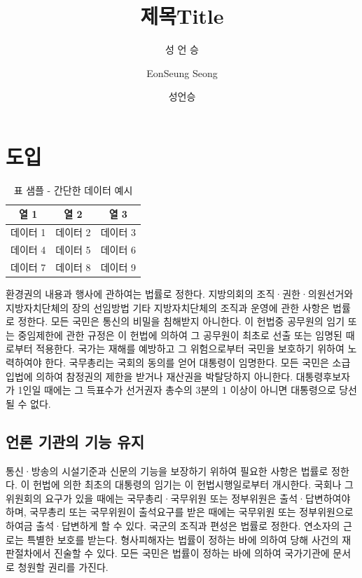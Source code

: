 \documentclass[master, korean]{pnuthesis}
\title[korean]{제목}
\title[english]{Title}
\author[korean]{성 언 승}
\author[english]{EonSeung Seong}
\author[nospace]{성언승}
\begin{document}
\renewcommand{\baselinestretch}{1.5}    %
\selectfont                             %

\changepage{5mm}{}{}{}{}{}{}{}{-5mm}    %
\makelists   %



\chapter{도입}


\begin{table}[!h]
    \centering
    \caption{표 샘플 - 간단한 데이터 예시}
    \label{tab:sample}
    \begin{tabular}{ccc}
        \toprule
        열 1 & 열 2 & 열 3 \\
        \midrule
        데이터 1 & 데이터 2 & 데이터 3 \\
        데이터 4 & 데이터 5 & 데이터 6 \\
        데이터 7 & 데이터 8 & 데이터 9 \\
        \bottomrule
    \end{tabular}
\end{table}



환경권의 내용과 행사에 관하여는 법률로 정한다. 지방의회의 조직·권한·의원선거와 지방자치단체의 장의 선임방법 기타 지방자치단체의 조직과 운영에 관한 사항은 법률로 정한다.\autocite{pennebaker1992jpeg} 모든 국민은 통신의 비밀을 침해받지 아니한다. 이 헌법중 공무원의 임기 또는 중임제한에 관한 규정은 이 헌법에 의하여 그 공무원이 최초로 선출 또는 임명된 때로부터 적용한다. 국가는 재해를 예방하고 그 위험으로부터 국민을 보호하기 위하여 노력하여야 한다. 국무총리는 국회의 동의를 얻어 대통령이 임명한다. 모든 국민은 소급입법에 의하여 참정권의 제한을 받거나 재산권을 박탈당하지 아니한다. 대통령후보자가 1인일 때에는 그 득표수가 선거권자 총수의 3분의 1 이상이 아니면 대통령으로 당선될 수 없다.

\section{언론 기관의 기능 유지}

통신·방송의 시설기준과 신문의 기능을 보장하기 위하여 필요한 사항은 법률로 정한다. 이 헌법에 의한 최초의 대통령의 임기는 이 헌법시행일로부터 개시한다. 국회나 그 위원회의 요구가 있을 때에는 국무총리·국무위원 또는 정부위원은 출석·답변하여야 하며, 국무총리 또는 국무위원이 출석요구를 받은 때에는 국무위원 또는 정부위원으로 하여금 출석·답변하게 할 수 있다. 국군의 조직과 편성은 법률로 정한다. 연소자의 근로는 특별한 보호를 받는다. 형사피해자는 법률이 정하는 바에 의하여 당해 사건의 재판절차에서 진술할 수 있다. 모든 국민은 법률이 정하는 바에 의하여 국가기관에 문서로 청원할 권리를 가진다.
\end{document}
